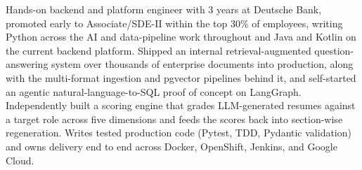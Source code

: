 \documentclass[11pt,a4paper,sans]{moderncv}
\begin{document}
\makecvtitle


\vspace{6pt}
\small{Hands-on backend and platform engineer with 3 years at Deutsche Bank, promoted early to Associate/SDE-II within the top 30\% of employees, writing Python across the AI and data-pipeline work throughout and Java and Kotlin on the current backend platform. Shipped an internal retrieval-augmented question-answering system over thousands of enterprise documents into production, along with the multi-format ingestion and pgvector pipelines behind it, and self-started an agentic natural-language-to-SQL proof of concept on LangGraph. Independently built a scoring engine that grades LLM-generated resumes against a target role across five dimensions and feeds the scores back into section-wise regeneration. Writes tested production code (Pytest, TDD, Pydantic validation) and owns delivery end to end across Docker, OpenShift, Jenkins, and Google Cloud.}

\end{document}
